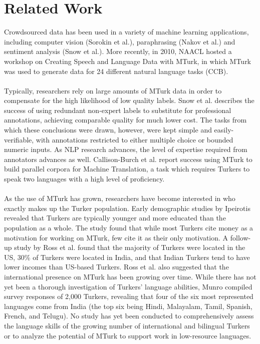 \documentclass[11pt]{article}
\begin{document}
\section{Related Work}
Crowdsourced data has been used in a variety of machine learning applications, including computer vision (Sorokin et al.), paraphrasing (Nakov et al.) and sentiment analysis (Snow et al.). More recently, in 2010, NAACL hosted a workshop on Creating Speech and Language Data with MTurk, in which MTurk was used to generate data for 24 different natural language tasks (CCB).\\\\
Typically, researchers rely on large amounts of MTurk data in order to compensate for the high likelihood of low quality labels. Snow et al. describes the success of using redundant non-expert labels to substitute for professional annotations, achieving comparable quality for much lower cost. The tasks from which these conclusions were drawn, however, were kept simple and easily-verifiable, with annotations restricted to either multiple choice or bounded numeric inputs. As NLP research advances, the level of expertise required from annotators advances as well. Callison-Burch et al. report success using MTurk to build parallel corpora for Machine Translation, a task which requires Turkers to speak two languages with a high level of proficiency.\\\\
As the use of MTurk has grown, researchers have become interested in who exactly makes up the Turker population. Early demographic studies by Ipeirotis revealed that Turkers are typically younger and more educated than the population as a whole. The study found that while most Turkers cite money as a motivation for working on MTurk, few cite it as their only motivation. A follow-up study by Ross et al. found that the majority of Turkers were located in the US, 30\% of Turkers were located in India, and that Indian Turkers tend to have lower incomes than US-based Turkers. Ross et al. also suggested that the international presence on MTurk has been growing over time. While there has not yet been a thorough investigation of Turkers' language abilities, Munro compiled survey responses of 2,000 Turkers, revealing that four of the six most represented languages come from India (the top six being Hindi, Malayalam, Tamil, Spanish, French, and Telugu). No study has yet been conducted to comprehensively assess the language skills of the growing number of international and bilingual Turkers or to analyze the potential of MTurk to support work in low-resource languages. \\\\
\end{document}
